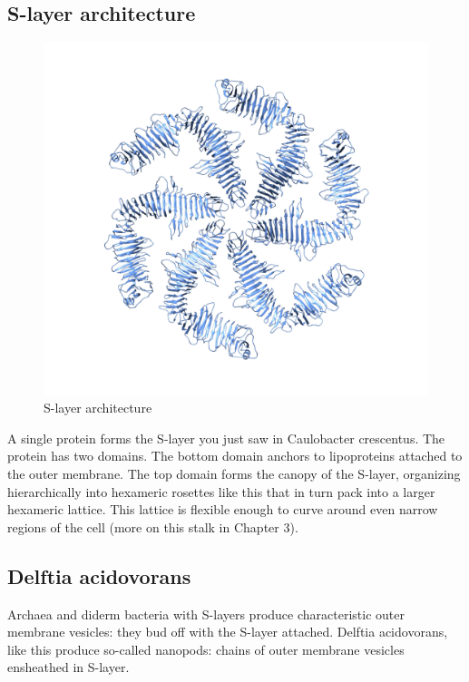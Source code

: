 \documentclass[]{tufte-book}
\begin{document}
\subsection{S-layer architecture}\label{s-layer-architecture}

\begin{figure}
\includegraphics{img/02_schematic/2_6_1_SLayerTop} \caption[S-layer architecture]{S-layer architecture}\label{fig:2-6-1}
\end{figure}

A single protein forms the S-layer you just saw in Caulobacter
crescentus. The protein has two domains. The bottom domain anchors to
lipoproteins attached to the outer membrane. The top domain forms the
canopy of the S-layer, organizing hierarchically into hexameric rosettes
like this that in turn pack into a larger hexameric lattice. This
lattice is flexible enough to curve around even narrow regions of the
cell (more on this stalk in Chapter 3).

\hypertarget{Nanopods}{\subsection{Delftia acidovorans}\label{Nanopods}}

Archaea and diderm bacteria with S-layers produce characteristic outer
membrane vesicles: they bud off with the S-layer attached. Delftia
acidovorans, like this produce so-called nanopods: chains of outer
membrane vesicles ensheathed in S-layer.
\end{document}
